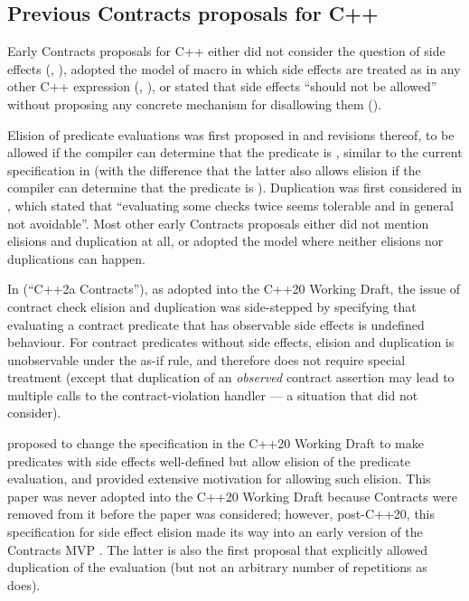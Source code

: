 \subsection{Previous Contracts proposals for C++}

Early Contracts proposals for C++ either did not consider the question of side effects (\cite{N1613}, \cite{N1669}), adopted the model of macro  in which side effects are treated as in any other C++ expression (\cite{N3604}, \cite{N4378}), or stated that side effects ``should not be allowed'' without proposing any concrete mechanism for disallowing them (\cite{N4110}).

Elision of predicate evaluations was first proposed in \cite{N1669} and revisions thereof, to be allowed if the compiler can determine that the predicate is , similar to the current specification in \cite{P2900R6} (with the difference that the latter also allows elision if the compiler can determine that the predicate is ). Duplication was first considered in \cite{P0247R0}, which stated that ``evaluating some checks twice seems tolerable and in general not avoidable''. Most other early Contracts proposals either did not mention elisions and duplication at all, or adopted the  model where neither elisions nor duplications can happen.

In \cite{P0542R5} (``C++2a Contracts''), as adopted into the C++20 Working Draft, the issue of contract check elision and duplication was side-stepped by specifying that evaluating a contract predicate that has observable side effects is undefined behaviour. For contract predicates without side effects, elision and duplication is unobservable under the as-if rule, and therefore does not require special treatment (except that duplication of an \emph{observed} contract assertion may lead to multiple calls to the contract-violation handler --- a situation that \cite{P0542R5} did not consider).

\cite{P1670R0} proposed to change the specification in the C++20 Working Draft to make predicates with side effects well-defined but allow elision of the predicate evaluation, and provided extensive motivation for allowing such elision. This paper was never adopted into the C++20 Working Draft because Contracts were removed from it before the paper was considered; however, post-C++20, this specification for side effect elision made its way into an early version of the Contracts MVP \cite{P2388R4}. The latter is also the first proposal that explicitly allowed duplication of the evaluation (but not an arbitrary number of repetitions as \cite{P2900R6} does).

